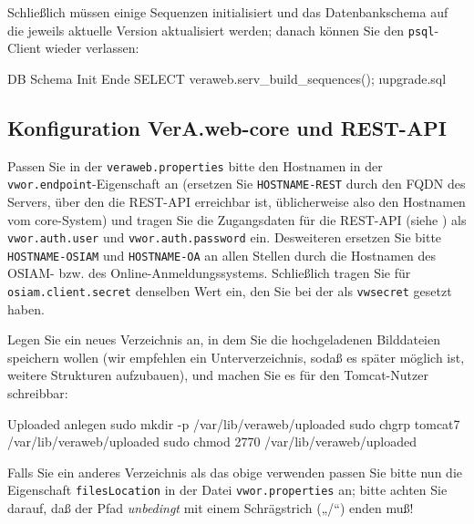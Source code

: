 \begin{minipage}{\textwidth}
Schließlich müssen einige Sequenzen initialisiert und das Datenbankschema
auf die jeweils aktuelle Version aktualisiert werden; danach können Sie
den \texttt{psql}-Client wieder verlassen:

\begin{lstdump}{DB Schema Init Ende}
SELECT veraweb.serv_build_sequences();
\i upgrade.sql
\q
\end{lstdump}
\end{minipage}

\subsection{Konfiguration VerA.web-core und REST-API}\label{subsec:setup-core-files}

Passen Sie in der \texttt{veraweb.properties} bitte den Hostnamen
in der \texttt{vwor.endpoint}-Eigenschaft an (ersetzen Sie
\texttt{HOSTNAME-REST} durch den FQDN des Servers, über den die
REST-API erreichbar ist, üblicherweise also den Hostnamen vom
core-System) und tragen Sie die Zugangsdaten für die REST-API
(siehe ) als \texttt{vwor.auth.user}
und \texttt{vwor.auth.password} ein.
\ifoa
Desweiteren ersetzen Sie bitte \texttt{HOSTNAME-OSIAM} und
\texttt{HOSTNAME-OA} an allen Stellen durch die Hostnamen
des OSIAM- bzw. des Online-Anmeldungssystems. Schließlich
tragen Sie für \texttt{osiam.client.secret} denselben Wert
ein, den Sie bei der 
als \texttt{vwsecret} gesetzt haben.
\fi%

\begin{minipage}{\textwidth}
Legen Sie ein neues Verzeichnis an, in dem Sie die hochgeladenen
Bilddateien speichern wollen (wir empfehlen ein Unterverzeichnis,
sodaß es später möglich ist, weitere Strukturen aufzubauen), und
machen Sie es für den Tomcat-Nutzer schreibbar:

\begin{lstdump}{Uploaded anlegen}
sudo mkdir -p /var/lib/veraweb/uploaded
sudo chgrp tomcat7 /var/lib/veraweb/uploaded
sudo chmod 2770 /var/lib/veraweb/uploaded
\end{lstdump}

Falls Sie ein anderes Verzeichnis als das obige verwenden passen
Sie bitte nun die Eigenschaft \texttt{filesLocation} in der Datei
\texttt{vwor.properties} an; bitte achten Sie darauf, daß der
Pfad \emph{unbedingt} mit einem Schrägstrich („/“) enden muß!
\end{minipage}

